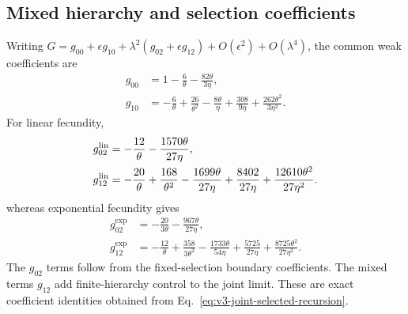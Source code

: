 \documentclass[aps,pre,reprint,amsmath,amssymb,longbibliography]{revtex4-2}
\begin{document}
\subsection{Mixed hierarchy and selection coefficients}
\label{par:v3-joint-selected-jet}
Writing $G=g_{00}+\epsilon g_{10}
+\lambda^2(g_{02}+\epsilon g_{12})+O(\epsilon^2)+O(\lambda^4)$,
the common weak coefficients are
\begin{equation}
 \begin{aligned}
 g_{00}&=1-\frac6\theta-\frac{82\theta}{3\eta},\\
 g_{10}&=-\frac6\theta+\frac{26}{\theta^2}-\frac{8\theta}{\eta}
             +\frac{308}{9\eta}+\frac{262\theta^2}{3\eta^2}.
 \end{aligned}
 \label{eq:v3-joint-weak-jet}
\end{equation}
For linear fecundity,
\begin{equation}
 \begin{aligned}
 g_{02}^{\rm lin}&=-\frac{12}\theta-\frac{1570\theta}{27\eta},\\
 g_{12}^{\rm lin}&=-\frac{20}\theta+\frac{168}{\theta^2}
 -\frac{1699\theta}{27\eta}+\frac{8402}{27\eta}+\frac{12610\theta^2}{27\eta^2}.
 \end{aligned}
 \label{eq:v3-joint-linear-jet}
\end{equation}
whereas exponential fecundity gives
\begin{equation}
 \begin{aligned}
 g_{02}^{\exp}&=-\frac{20}{3\theta}-\frac{967\theta}{27\eta},\\
 g_{12}^{\exp}&=-\frac{12}\theta+\frac{358}{3\theta^2}
 -\frac{1733\theta}{54\eta}+\frac{5725}{27\eta}+\frac{8725\theta^2}{27\eta^2}.
 \end{aligned}
 \label{eq:v3-joint-exp-jet}
\end{equation}
The $g_{02}$ terms follow from the fixed-selection
boundary coefficients. The mixed terms $g_{12}$ add finite-hierarchy
control to the joint limit. These are exact coefficient identities obtained from
Eq.~\eqref{eq:v3-joint-selected-recursion}.
\end{document}
